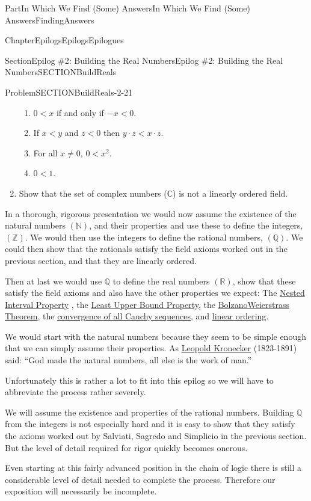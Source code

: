 \documentclass[oneside,10pt,]{book}
\numberwithin{equation}{part}
\newcommand{\CC}{\mathbb {C}}
\newcommand{\RR}{\mathbb {R}}
\newcommand{\QQ}{\mathbb {Q}}
\newcommand{\NN}{\mathbb {N}}
\newcommand{\ZZ}{\mathbb {Z}}
\newcommand{\lt}{<}
\begin{document}
\begin{partptx}{Part}{In Which We Find (Some) Answers}{}{In Which We Find (Some) Answers}{}{}{FindingAnswers}
\begin{chapterptx}{Chapter}{Epilogs}{}{Epilogs}{}{}{Epilogues}
\begin{sectionptx}{Section}{Epilog \#2: Building the Real Numbers}{}{Epilog \#2: Building the Real Numbers}{}{}{SECTIONBuildReals}
\begin{introduction}{}
\begin{problem}{Problem}{}{SECTIONBuildReals-2-21}
\begin{enumerate}[font=\bfseries,label=(\alph*),ref=\alph*]
%
\begin{enumerate}
\item{}\(0\lt x\) if and only if \(-x\lt 0\).%
\item{}If \(x\lt y\) and \(z\lt 0\) then \(y\cdot z\lt x\cdot z\).%
\item{}For all \(x\neq 0\), \(0\lt x^2\).%
\item{}\(0\lt 1\).%
\end{enumerate}
%
\item{}Show that the set of complex numbers (\(\CC\)) is not a linearly ordered field.%
\end{enumerate}%
\end{problem}
In a thorough, rigorous presentation we would now assume the existence of the natural numbers \((\NN)\), and their properties and use these to define the integers, \((\ZZ)\).  We would then use the integers to define the rational numbers, \((\QQ)\).  We could then show that the rationals satisfy the field axioms worked out in the previous section, and that they are linearly ordered.%
\par
Then \textemdash{} at last \textemdash{} we would use \(\QQ\) to define the real numbers \((\RR)\), show that these satisfy the field axioms and also have the other properties we expect:  The \hyperref[NIP]{Nested Interval Property} , the \hyperref[def_LeastUpperBound]{Least Upper Bound Property}, the \hyperref[BolzanoWeierstrass]{Bolzano\textendash{}Weierstrass Theorem}, the \hyperref[thm_Cauchy-_Converge]{convergence of all Cauchy sequences}, and \hyperref[def_NumberField]{linear ordering}.%
\par
We would start with the natural numbers because they seem to be simple enough that we can simply assume their properties. As \href{https://mathshistory.st-andrews.ac.uk/Biographies/Kronecker/}{Leopold Kronecker} (1823-1891) said: ``God made the natural numbers, all else is the work of man.''%
\par
Unfortunately this is rather a lot to fit into this epilog so we will have to abbreviate the process rather severely.%
\par
We will assume the existence and properties of the rational numbers.  Building \(\QQ\) from the integers is not especially hard and it is easy to show that they satisfy the axioms worked out by Salviati, Sagredo and Simplicio in the previous section.  But the level of detail required for rigor quickly becomes onerous.%
\par
Even starting at this fairly advanced position in the chain of logic there is still a considerable level of detail needed to complete the process.  Therefore our exposition will necessarily be incomplete.%

\end{introduction}
\end{sectionptx}
\end{chapterptx}
\end{partptx}
\end{document}
